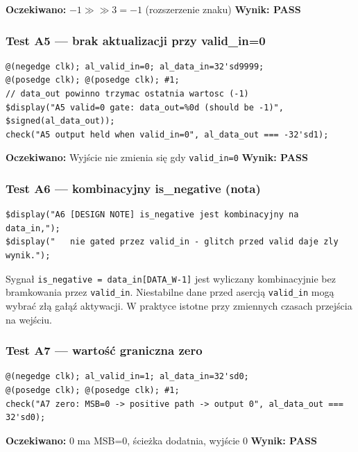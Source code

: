 \documentclass[12pt,a4paper]{article}
\begin{document}
\textbf{Oczekiwano:} $-1 \gg\gg 3 = -1$ (rozszerzenie znaku) \quad \textbf{Wynik: PASS}

\subsubsection*{Test A5 — brak aktualizacji przy valid\_in=0}

\begin{lstlisting}
@(negedge clk); al_valid_in=0; al_data_in=32'sd9999;
@(posedge clk); @(posedge clk); #1;
// data_out powinno trzymac ostatnia wartosc (-1)
$display("A5 valid=0 gate: data_out=%0d (should be -1)", $signed(al_data_out));
check("A5 output held when valid_in=0", al_data_out === -32'sd1);
\end{lstlisting}

\textbf{Oczekiwano:} Wyjście nie zmienia się gdy \texttt{valid\_in=0} \quad \textbf{Wynik: PASS}

\subsubsection*{Test A6 — kombinacyjny is\_negative (nota)}

\begin{lstlisting}
$display("A6 [DESIGN NOTE] is_negative jest kombinacyjny na data_in,");
$display("   nie gated przez valid_in - glitch przed valid daje zly wynik.");
\end{lstlisting}

\begin{infobox}
Sygnał \texttt{is\_negative = data\_in[DATA\_W-1]} jest wyliczany kombinacyjnie bez bramkowania przez \texttt{valid\_in}. Niestabilne dane przed asercją \texttt{valid\_in} mogą wybrać złą gałąź aktywacji. W praktyce istotne przy zmiennych czasach przejścia na wejściu.
\end{infobox}

\subsubsection*{Test A7 — wartość graniczna zero}

\begin{lstlisting}
@(negedge clk); al_valid_in=1; al_data_in=32'sd0;
@(posedge clk); @(posedge clk); #1;
check("A7 zero: MSB=0 -> positive path -> output 0", al_data_out === 32'sd0);
\end{lstlisting}

\textbf{Oczekiwano:} $0$ ma MSB=0, ścieżka dodatnia, wyjście $0$ \quad \textbf{Wynik: PASS}
\end{document}
